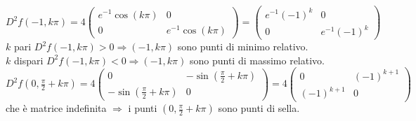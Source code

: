 \documentclass{article}
\begin{document}
$D^2f(-1, k\pi)=4 \begin{pmatrix}
    e^{-1}\cos(k \pi)&0\\
    0&e^{-1}\cos(k\pi)
\end{pmatrix}=\begin{pmatrix}
    e^{-1}(-1)^k&0\\
    0&e^{-1}(-1)^k
\end{pmatrix}$\\
$k$ pari $D^2f(-1,k\pi) >0 \Rightarrow (-1,k\pi)$ sono punti di minimo relativo.\\
$k$ dispari $D^2f(-1,k\pi)< 0 \Rightarrow (-1,k\pi)$ sono punti di massimo relativo.\\
$D^2f(0,\frac{\pi}{2}+k \pi)=4 \begin{pmatrix}
    0 & -\sin(\frac{\pi}{2}+k\pi)\\
    -\sin(\frac{\pi}{2}+k\pi)& 0
\end{pmatrix}=4 \begin{pmatrix}
    0&(-1)^{k+1}\\
    (-1)^{k+1}&0
\end{pmatrix}$\\
che è matrice indefinita $\Rightarrow$ i punti $(0,\frac{\pi}{2}+k \pi)$ sono punti di sella.
\end{document}
